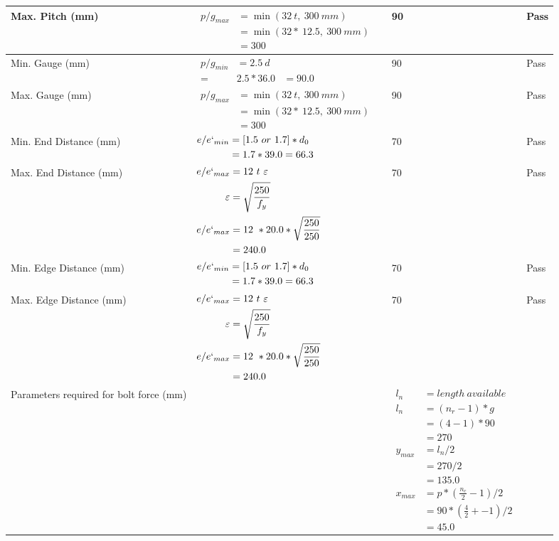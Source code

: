 \documentclass{article}%
\begin{document}
\begin{longtable}{|p{4cm}|p{5cm}|p{5.5cm}|p{1.5cm}|}
Max. Pitch (mm)&$\begin{aligned}p/g_{max} &=\min(32~t,~300~mm)&\\ &=\min(32 *~12.5,~ 300 ~mm)\\&=300\end{aligned}$&90&Pass\\%
\hline%
Min. Gauge (mm)&$\begin{aligned}p/g_{min}&= 2.5 ~ d&\\ =&2.5*36.0&=90.0\end{aligned}$&90&Pass\\%
\hline%
Max. Gauge (mm)&$\begin{aligned}p/g_{max} &=\min(32~t,~300~mm)&\\ &=\min(32 *~12.5,~ 300 ~mm)\\&=300\end{aligned}$&90&Pass\\%
\hline%
Min. End Distance (mm)&$\begin{aligned}e/e`_{min} &=[1.5~or~ 1.7] * d_0\\ &=1.7*39.0=66.3 \end{aligned}$&70&Pass\\%
\hline%
Max. End Distance (mm)&$\begin{aligned}e/e`_{max} &= 12~ t~ \varepsilon&\\ \varepsilon &= \sqrt{\frac{250}{f_y}}\\ e/e`_{max}&=12 ~*20.0*\sqrt{\frac{250}{250}}\\ &=240.0\\ \end{aligned}$&70&Pass\\%
\hline%
Min. Edge Distance (mm)&$\begin{aligned}e/e`_{min} &=[1.5~or~ 1.7] * d_0\\ &=1.7*39.0=66.3 \end{aligned}$&70&Pass\\%
\hline%
Max. Edge Distance (mm)&$\begin{aligned}e/e`_{max} &= 12~ t~ \varepsilon&\\ \varepsilon &= \sqrt{\frac{250}{f_y}}\\ e/e`_{max}&=12 ~*20.0*\sqrt{\frac{250}{250}}\\ &=240.0\\ \end{aligned}$&70&Pass\\%
\hline%
Parameters required for bolt force (mm)&&$\begin{aligned} l_n~~~ &= length~available \\  l_n~~~ &= (n_r - 1) * g\\  &= (4 - 1) *90\\  & =270\\  y_{max} &= l_n / 2\\  &= 270 / 2 \\  & =135.0\\ x_{max} &= p * (\frac{n_c}{2} - 1) / 2 \\  &= 90 * (\frac{4}{2} + - 1) / 2 \\  & =45.0\end{aligned}$&\\%

\end{longtable}
\end{document}
